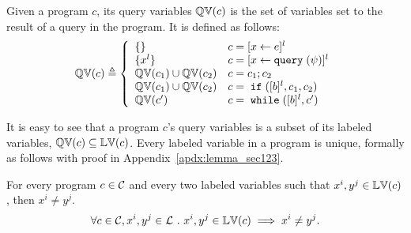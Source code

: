 \begin{defn} 
  \label{def:qvar}
Given a program $c$, its query variables 
$\mathbb{QV}(c)$ is the set of variables set to the result of a query in the program.
It is defined as follows:
{
$$
  \qvar(c) \triangleq
  \left\{
  \begin{array}{ll}
      \{\}                  
      & {c} = [{\assign x \expr}]^{l} 
      \\
      \{{x}^l\}                  
      & {c} = [{\assign x \query(\qexpr)}]^{l} 
      \\
      \qvar(c_1) \cup \qvar(c_2)  
      & {c} = {c_1};{c_2}
      \\
      \qvar(c_1) \cup \qvar(c_2) 
      & {c} =\eif([\bexpr]^{l}, c_1, c_2) 
      \\
      \qvar(c')
      & {c}   = \ewhile ([\bexpr]^{l}, {c}')
\end{array}
\right.
$$
}
\end{defn}
%
It is easy to see that a program $c$'s query variables is a subset of 
its labeled variables, $\mathbb{QV}(c) \subseteq \mathbb{LV}(c)$.
%
%
Every labeled variable in a program is unique, formally as follows with proof in Appendix~\ref{apdx:lemma_sec123}.
\begin{lem}
  \label{lem:lvar_unique}
  For every program $c \in \mathcal{C}$ and every two labeled variables such that
  $x^i, y^j \in \mathbb{LV}(c)$, then $x^i \neq y^j$.
  \[
    \forall c \in \mathcal{C}, x^i, y^j \in \mathcal{L} ~.~ x^i, y^j \in \mathbb{LV}(c)\implies x^i \neq y^j.
    \]
\end{lem}